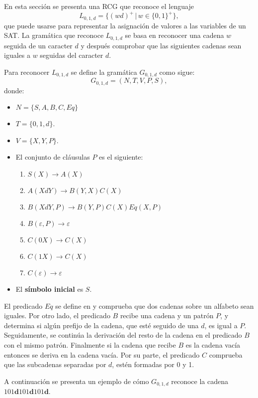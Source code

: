 En esta sección se presenta una RCG que reconoce el lenguaje $$L_{0,1,d}=\{(wd)^+\,|\,w\in\{0,1\}^+\},$$ que puede usarse para representar la asignación de valores a las variables de un SAT. La gramática que reconoce $L_{0,1,d}$ se basa en reconocer una cadena $w$ seguida de un caracter $d$ y después comprobar que las siguientes cadenas sean iguales a $w$ seguidas del caracter $d$.

Para reconocer $L_{0,1,d}$ se define la gramática $G_{0,1,d}$ como sigue:
\[
    G_{0,1,d} = (N, T, V, P, S),
\]
donde:

\begin{itemize}
    \item $N=\{S,A,B,C,Eq\}$
    \item $T=\{0,1,d\}$.
    \item $V=\{X,Y,P\}$.
    \item El conjunto de cláusulas $P$ es el siguiente:
          \begin{enumerate}
              \item $S(X)\to A(X)$
              \item $A(XdY)\to B(Y,X)C(X)$
              \item $B(XdY,P)\to B(Y,P) C(X) Eq(X,P)$
              \item $B(\varepsilon,P)\to \varepsilon$
              \item $C(0X)\to C(X)$
              \item $C(1X)\to C(X)$
              \item $C(\varepsilon)\to \varepsilon$
          \end{enumerate}
    \item El \textbf{símbolo inicial} es $S$.
\end{itemize}

El predicado $Eq$ se define en \cite{mainRCGBib} y comprueba que dos cadenas sobre un alfabeto sean iguales.  Por otro lado, el predicado $B$ recibe una cadena y un patrón $P$, y determina si algún prefijo de la cadena, que esté seguido de una $d$, es igual a $P$. Seguidamente, se continúa la derivación del resto de la cadena en el predicado $B$ con el mismo patrón. Finalmente si la cadena que recibe $B$ es la cadena vacía entonces se deriva en la cadena vacía. Por su parte, el predicado $C$ comprueba que las subcadenas separadas por $d$, estén formadas por 0 y 1.

A continuación se presenta un ejemplo de cómo $G_{0,1,d}$ reconoce la cadena $101\mathbf{d}101\mathbf{d}101\mathbf{d}$.


